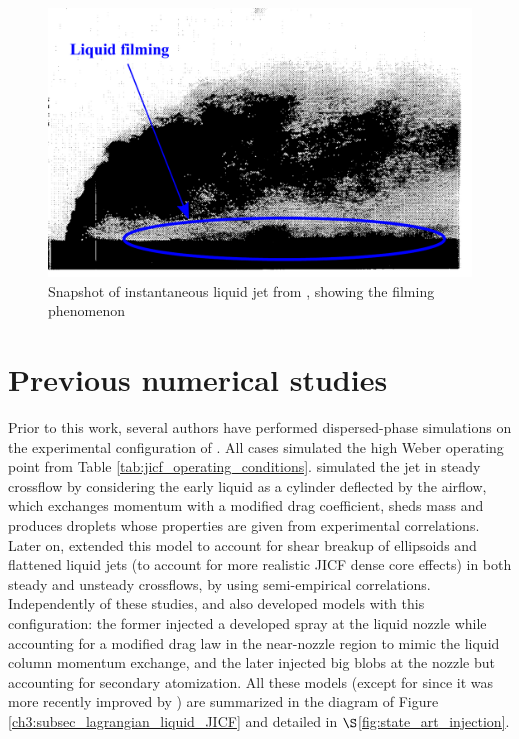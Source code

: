 \begin{figure}[h!]	
	\centering	
	\includegraphics[scale=0.4]{./part2_developments/figures_ch6_lagrangian_JICF/expe_results/snapshot_expe_filming}
	\caption{Snapshot of instantaneous liquid jet from , showing the filming phenomenon}
	\label{fig:jicf_snapshot_expe_filming}
\end{figure}



%

\section{Previous numerical studies}

Prior to this work, several authors have performed dispersed-phase simulations on the experimental configuration of . All cases simulated the high Weber operating point from Table \ref{tab:jicf_operating_conditions}.  simulated the jet in steady crossflow by considering the early liquid as a cylinder deflected by the airflow, which exchanges momentum with a modified drag coefficient, sheds mass and produces droplets whose properties are given from experimental correlations. Later on,  extended this model to account for shear breakup of ellipsoids and flattened liquid jets (to account for more realistic JICF dense core effects) in both steady and unsteady crossflows, by using semi-empirical correlations. Independently of these studies,  and  also developed models with this configuration: the former injected a developed spray at the liquid nozzle while accounting for a modified drag law in the near-nozzle region to mimic the liquid column momentum exchange, and the later injected big blobs at the nozzle but accounting for secondary atomization. All these models (except for
 since it was more recently improved by ) are summarized in the diagram of Figure \ref{ch3:subsec_lagrangian_liquid_JICF} and detailed in $\S$\ref{fig:state_art_injection}.

